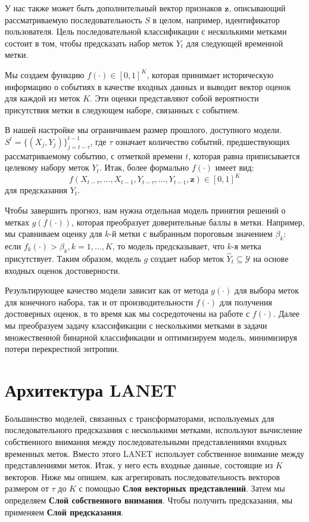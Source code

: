 \documentclass[a4paper, 12pt]{article} %
\begin{document}
У нас также может быть дополнительный вектор признаков $\mathbf{z}$, описывающий рассматриваемую последовательность $S$ в целом, например, идентификатор пользователя.
Цель последовательной классификации с несколькими метками состоит в том, чтобы предсказать набор меток $Y_{t}$ для следующей временной метки.

Мы создаем функцию $f(\cdot) \in [0, 1]^K$, которая принимает историческую информацию о событиях в качестве входных данных и выводит вектор оценок для каждой из меток $K$. Эти оценки представляют собой вероятности присутствия метки в следующем наборе, связанных с событием.

В нашей настройке мы ограничиваем размер прошлого, доступного модели.
$S^t = \{(X_{j}, Y_{j})\}_{j = t - \tau}^{t-1}$, где $\tau$ означает количество событий, предшествующих рассматриваемому событию, с отметкой времени $t$, которая равна приписывается целевому набору меток $Y_{t}$.
Итак, более формально $f(\cdot)$ имеет вид:
$$
f(X_{t - \tau}, \ldots, X_{t-1}, Y_{t - \tau}, \ldots, Y_{t-1}, \textbf{z}) \in [0, 1]^K
$$
для предсказания $Y_{t}$.

Чтобы завершить прогноз, нам нужна отдельная модель принятия решений о метках $g(f(\cdot))$, которая преобразует доверительные баллы в метки.
Например, мы сравниваем оценку для $k$-й метки с выбранным пороговым значением $\beta_k$: если $f_k(\cdot) > \beta_k, k = 1, \dots, K$, то модель предсказывает, что $k$-я метка присутствует. Таким образом, модель $g$ создает набор меток $\hat{Y}_{t} \subseteq \mathcal{Y}$ на основе входных оценок достоверности.

Результирующее качество модели зависит как от метода $g(\cdot)$ для выбора меток для конечного набора, так и от производительности $f(\cdot)$ для получения достоверных оценок, в то время как мы сосредоточены на работе с $f(\cdot)$. Далее мы преобразуем задачу классификации с несколькими метками в задачи множественной бинарной классификации и оптимизируем модель, минимизируя потери перекрестной энтропии.

\section{Архитектура LANET}
Большинство моделей, связанных с трансформаторами, используемых для последовательного предсказания с несколькими метками, используют вычисление собственного внимания между последовательными представлениями входных временных меток. 
Вместо этого LANET использует собственное внимание между представлениями меток. 
Итак, у него есть входные данные, состоящие из $K$ векторов.
Ниже мы опишем, как агрегировать последовательность векторов размером от $\tau$ до $K$ с помощью \textbf{Слоя векторных представлений}. Затем мы определяем \textbf{Слой собственного внимания}.
Чтобы получить предсказания, мы применяем \textbf{Слой предсказания}.
\end{document}
